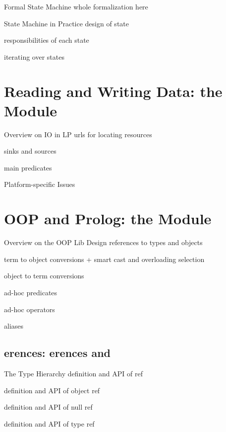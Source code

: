 \documentclass[handout]{beamer}
\begin{document}
\begin{frame}[allowframebreaks]{Formal State Machine}
    whole formalization here
\end{frame}

\begin{frame}[allowframebreaks]{State Machine in Practice}
    design of state

    responsibilities of each state

    iterating over states
\end{frame}

\section{Reading and Writing Data: the  Module}

\begin{frame}[allowframebreaks]{Overview on IO in LP}
    urls for locating resources

    sinks and sources

    main predicates
\end{frame}

\begin{frame}[allowframebreaks]{Platform-specific Issues}

\end{frame}

\section{OOP and Prolog: the  Module}

\begin{frame}[allowframebreaks]{Overview on the OOP Lib Design}
    references to types and objects

    term to object conversions
        + smart cast and overloading selection

    object to term conversions

    ad-hoc predicates

    ad-hoc operators

    aliases
\end{frame}

\subsection{erences: erences and }

\begin{frame}[allowframebreaks]{The  Type Hierarchy}
    definition and API of ref

    definition and API of object ref

    definition and API of null ref

    definition and API of type ref
\end{frame}
\end{document}
